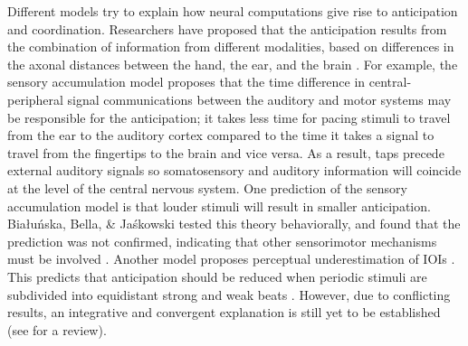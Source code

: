 \documentclass{report}
\begin{document}
Different models try to explain how neural computations give rise to anticipation and coordination. Researchers have proposed that the anticipation results from the combination of information from different modalities, based on differences in the axonal distances between the hand, the ear, and the brain \cite{aschersleben1995synchronizing, prinz1992don}. For example, the sensory accumulation model \cite{aschersleben2002temporal} proposes that the time difference in central-peripheral signal communications between the auditory and motor systems may be responsible for the anticipation; it takes less time for pacing stimuli to travel from the ear to the auditory cortex compared to the time it takes a signal to travel from the fingertips to the brain and vice versa. As a result, taps precede external auditory signals so somatosensory and auditory information will coincide at the level of the central nervous system. One prediction of the sensory accumulation model is that louder stimuli will result in smaller anticipation. Bia{\l}u{\'n}ska, Bella, \& Ja{\'s}kowski tested this theory behaviorally, and found that the prediction was not confirmed, indicating that other sensorimotor mechanisms must be involved \cite{bialunska2011increasing}. Another model proposes perceptual underestimation of IOIs \cite{flach2005transition}. This predicts that anticipation should be reduced when periodic stimuli are subdivided into equidistant strong and weak beats \cite{loehr2009subdividing, repp2008metrical, zendel2011effects}. However, due to conflicting results, an integrative and convergent explanation is still yet to be established (see \cite{repp2013sensorimotor} for a review).
\end{document}
